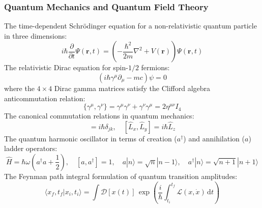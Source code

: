 \documentclass[11pt, a4paper]{article}
\begin{document}
\subsubsection{Quantum Mechanics and Quantum Field Theory}
The time-dependent Schrödinger equation for a non-relativistic quantum particle in three dimensions:
\begin{equation}
i \hbar \frac{\partial}{\partial t} \Psi(\mathbf{r}, t) = \left( -\frac{\hbar^2}{2m} \nabla^2 + V(\mathbf{r}) \right) \Psi(\mathbf{r}, t)
\end{equation}
The relativistic Dirac equation for spin-$1/2$ fermions:
\begin{equation}
\left( i \hbar \gamma^\mu \partial_\mu - mc \right) \psi = 0
\end{equation}
where the $4 \times 4$ Dirac gamma matrices satisfy the Clifford algebra anticommutation relation:
\begin{equation}
\{\gamma^\mu, \gamma^\nu\} = \gamma^\mu \gamma^\nu + \gamma^\nu \gamma^\mu = 2 \eta^{\mu\nu} I_4
\end{equation}
The canonical commutation relations in quantum mechanics:
\begin{equation}
[\hat{x}_j, \hat{p}_k] = i \hbar \delta_{jk}, \quad [\hat{L}_x, \hat{L}_y] = i \hbar \hat{L}_z
\end{equation}
The quantum harmonic oscillator in terms of creation ($a^\dagger$) and annihilation ($a$) ladder operators:
\begin{equation}
\hat{H} = \hbar \omega \left( a^\dagger a + \frac{1}{2} \right), \quad [a, a^\dagger] = 1, \quad a |n\rangle = \sqrt{n} |n-1\rangle, \quad a^\dagger |n\rangle = \sqrt{n+1} |n+1\rangle
\end{equation}
The Feynman path integral formulation of quantum transition amplitudes:
\begin{equation}
\langle x_f, t_f | x_i, t_i \rangle = \int \mathcal{D}[x(t)] \, \exp\left( \frac{i}{\hbar} \int_{t_i}^{t_f} \mathcal{L}(x, \dot{x}) \, \mathrm{d}t \right)
\end{equation}
\end{document}
